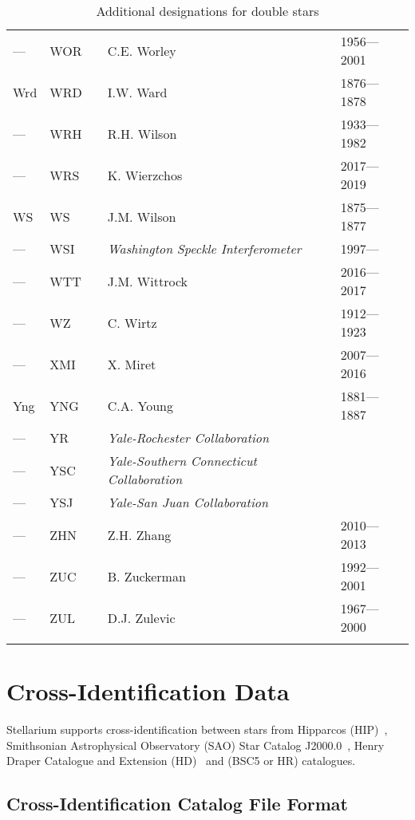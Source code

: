\begin{longtable}{l|l|c|p{59mm}|l}
--- & WOR &   & C.E. Worley & 1956---2001 \\
Wrd & WRD &   & I.W. Ward & 1876---1878 \\
--- & WRH &   & R.H. Wilson & 1933---1982 \\
--- & WRS &   & K. Wierzchos & 2017---2019 \\
WS  & WS  &   & J.M. Wilson & 1875---1877 \\
--- & WSI &   & \emph{Washington Speckle Interferometer} & 1997--- \\
--- & WTT &   & J.M. Wittrock & 2016---2017 \\
--- & WZ  &   & C. Wirtz & 1912---1923 \\\midrule
--- & XMI &   & X. Miret & 2007---2016 \\\midrule
Yng & YNG &   & C.A. Young & 1881---1887 \\
--- & YR  &   & \emph{Yale-Rochester Collaboration} & \\
--- & YSC &   & \emph{Yale-Southern Connecticut  Collaboration} & \\
--- & YSJ  &   & \emph{Yale-San Juan Collaboration} & \\\midrule
--- & ZHN &   & Z.H. Zhang & 2010---2013 \\
---  & ZUC  &   & B. Zuckerman & 1992---2001 \\
---  & ZUL  &   & D.J. Zulevic & 1967---2000 \\\bottomrule
\caption{Additional designations for double stars}
\label{tab:StarCatalogues:DoubleStars:Designations}
\end{longtable}

\section{Cross-Identification Data}
\label{sec:StarCatalogues:CrossIdentificationData}

Stellarium supports cross-identification between stars from 
Hipparcos (HIP)~\citep{2012AstL...38..331A}, 
Smithsonian Astrophysical Observatory (SAO) Star Catalog J2000.0~\citep{1995yCat.1131....0S}, Henry Draper Catalogue and Extension (HD)~\citep{1993yCat.3135....0C} and 
  (BSC5 or HR) %
catalogues.

\subsection{Cross-Identification Catalog File Format}
\label{sec:StarCatalogues:CrossIdentificationData:format}

